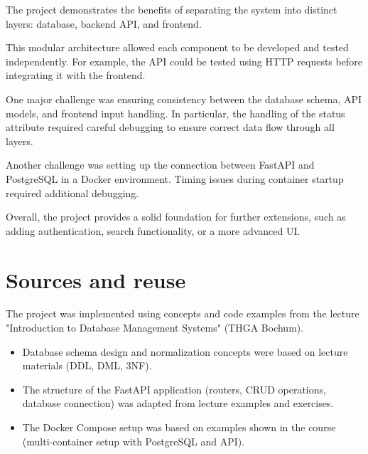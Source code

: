\documentclass[11pt,a4paper]{article}
\begin{document}
The project demonstrates the benefits of separating the system into distinct
layers: database, backend API, and frontend.

This modular architecture allowed each component to be developed and tested
independently. For example, the API could be tested using HTTP requests before
integrating it with the frontend.

One major challenge was ensuring consistency between the database schema,
API models, and frontend input handling. In particular, the handling of the
status attribute required careful debugging to ensure correct data flow
through all layers.

Another challenge was setting up the connection between FastAPI and PostgreSQL
in a Docker environment. Timing issues during container startup required
additional debugging.

Overall, the project provides a solid foundation for further extensions,
such as adding authentication, search functionality, or a more advanced UI.
\section*{Sources and reuse}


The project was implemented using concepts and code examples from the lecture
"Introduction to Database Management Systems" (THGA Bochum).

\begin{itemize}

  \item Database schema design and normalization concepts were based on lecture
        materials (DDL, DML, 3NF).

  \item The structure of the FastAPI application (routers, CRUD operations,
        database connection) was adapted from lecture examples and exercises.

  \item The Docker Compose setup was based on examples shown in the course
        (multi-container setup with PostgreSQL and API).

\end{itemize}
\end{document}
